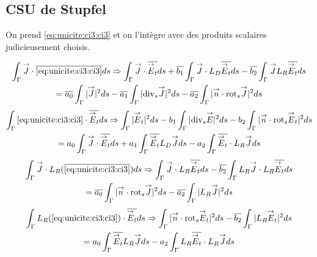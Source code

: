 

\subsection{CSU de Stupfel}

  On prend \eqref{eq:unicite:ci3:ci3} et on l’intègre avec des produits scalaires judicieusement choisis.

  \begin{multline}
    \label{eq:unicite:ci3:csu3-1}
    \int_\Gamma \vJ\cdot\conj{\eqref{eq:unicite:ci3:ci3}}ds \Rightarrow
    \int_\Gamma \vJ \cdot \conj{\vE_t} ds  + \conj{b_1} \int_\Gamma \vJ\cdot L_D\conj{\vE_t} ds - \conj{b_2} \int_\Gamma \vJ L_R\conj{\vE_t} ds \\
    = \conj{a_0} \int_\Gamma |\vJ|^2ds - \conj{a_1} \int_\Gamma |\tdivs \vJ|^2 ds - \conj{a_2} \int_\Gamma |\vn \cdot \trots \vJ|^2 ds
  \end{multline}
  \begin{multline}
    \label{eq:unicite:ci3:csu3-2}
    \int_\Gamma \eqref{eq:unicite:ci3:ci3} \cdot \conj{\vE_t} ds \Rightarrow
    \int_\Gamma |\vE_t|^2 ds  - b_1 \int_\Gamma | \tdivs \vE |^2 ds - b_2 \int_\Gamma | \vn \cdot \trots \vE_t|^2 ds \\
    = a_0 \int_\Gamma \vJ\cdot \conj{\vE_t}ds + a_1 \int_\Gamma \conj{\vE_t} L_D \vJ ds - a_2 \int_\Gamma \conj{\vE_t} \cdot L_R \vJ ds
  \end{multline}
  \begin{multline}
    \label{eq:unicite:ci3:csu3-3}
    \int_\Gamma \vJ \cdot L_R ( \conj{\eqref{eq:unicite:ci3:ci3}} ) ds \Rightarrow
    \int_\Gamma \vJ \cdot L_R \conj{\vE_t} ds  - \conj{b_2} \int_\Gamma L_R \vJ \cdot L_R \conj{\vE_t} ds \\
    =  \conj{a_0} \int_\Gamma |\vn \cdot \trots \vJ|^2ds - \conj{a_2} \int_\Gamma | L_R \vJ|^2 ds
  \end{multline}
  \begin{multline}
    \label{eq:unicite:ci3:csu3-4}
    \int_\Gamma  L_R ( \eqref{eq:unicite:ci3:ci3} ) \cdot \conj{\vE_t} ds \Rightarrow
    \int_\Gamma | \vn \cdot \trots \vE_t |^2 ds  - \conj{b_2} \int_\Gamma | L_R \vE_t|^2 ds \\
    = a_0 \int_\Gamma \conj{\vE_t} L_R \vJ ds - a_2 \int_\Gamma L_R \conj{\vE_t} \cdot L_R \vJ ds
  \end{multline}
